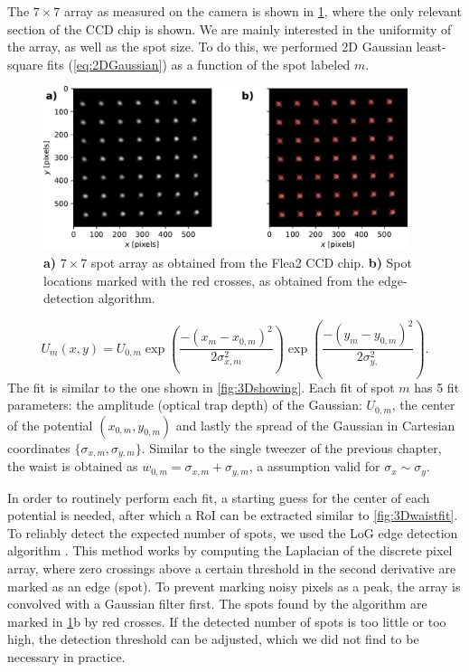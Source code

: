 The $7\times7$ array as measured on the camera is shown in \cref{fig:CameraLoG}, where the only relevant section of the CCD chip is shown. 
We are mainly interested in the uniformity of the array, as well as the spot size.
To do this, we performed 2D Gaussian least-square fits (\cref{eq:2DGaussian}) as a function of the spot labeled $m$.

\begin{figure}
    \centering
    \includegraphics[width=0.95\textwidth]{figures/CamImgLoGSpots.pdf}
    \caption{\textbf{a)} $7\times7$ spot array as obtained from the Flea2 CCD chip.
    \textbf{b)} Spot locations marked with the red crosses, as obtained from the edge-detection algorithm. }
    \label{fig:CameraLoG}
\end{figure}

\begin{equation}\label{eq:2DGaussianNumberK}
    U_m(x,y) = U_{0,m}\exp{\left(\frac{-(x_m-x_{0,m})^2}{2\sigma_{x,m}^2}\right)}
    \exp{\left( \frac{-(y_m-y_{0,m})^2}{2\sigma_{y,}^2} \right)}.
\end{equation}
The fit is similar to the one shown in \cref{fig:3Dshowing}.
Each fit of spot $m$ has 5 fit parameters: the amplitude (optical trap depth) of the Gaussian: $U_{0,m}$, the center of the potential $(x_{0,m}, y_{0,m})$ and lastly the spread of the Gaussian in Cartesian coordinates $\{\sigma_{x,m},\sigma_{y,m}\}$.
Similar to the single tweezer of the previous chapter, the waist is obtained as $w_{0,m} = \sigma_{x,m}+\sigma_{y,m}$, a assumption valid for $\sigma_x\sim\sigma_y$.

In order to routinely perform each fit, a starting guess for the center of each potential is needed, after which a \ac{RoI} can be extracted similar to \cref{fig:3Dwaistfit}.
To reliably detect the expected number of spots, we used the \ac{LoG} edge detection algorithm \cite{Haralick1992}. This method works by computing the Laplacian of the discrete pixel array, where zero crossings above a certain threshold in the second derivative are marked as an edge (spot). 
To prevent marking noisy pixels as a peak, the array is convolved with a Gaussian filter first. 
The spots found by the algorithm are marked in \ref{fig:CameraLoG}b by red crosses. 
If the detected number of spots is too little or too high, the detection threshold can be adjusted, which we did not find to be necessary in practice. 

